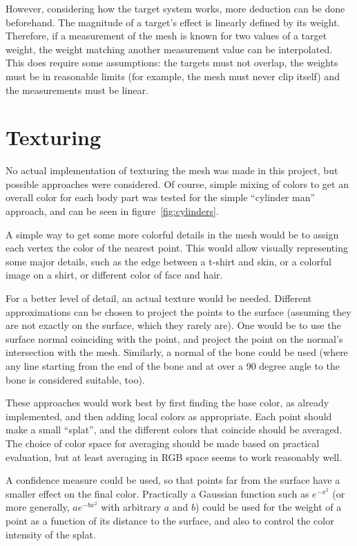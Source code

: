 However, considering how the target system works, more deduction can be done beforehand. The magnitude of a target's effect is linearly defined by its weight. Therefore, if a measurement of the mesh is known for two values of a target weight, the weight matching another measurement value can be interpolated. This does require some assumptions: the targets must not overlap, the weights must be in reasonable limits (for example, the mesh must never clip itself) and the measurements must be linear.


\section{Texturing}

No actual implementation of texturing the mesh was made in this project, but possible approaches were considered. Of course, simple mixing of colors to get an overall color for each body part was tested for the simple ``cylinder man'' approach, and can be seen in figure~\ref{fig:cylinders}.

A simple way to get some more colorful details in the mesh would be to assign each vertex the color of the nearest point. This would allow visually representing some major details, such as the edge between a t-shirt and skin, or a colorful image on a shirt, or different color of face and hair.

For a better level of detail, an actual texture would be needed. Different approximations can be chosen to project the points to the surface (assuming they are not exactly on the surface, which they rarely are). One would be to use the surface normal coinciding with the point, and project the point on the normal's intersection with the mesh. Similarly, a normal of the bone could be used (where any line starting from the end of the bone and at over a 90 degree angle to the bone is considered suitable, too).

These approaches would work best by first finding the base color, as already implemented, and then adding local colors as appropriate. Each point should make a small ``splat'', and the different colors that coincide should be averaged. The choice of color space for averaging should be made based on practical evaluation, but at least averaging in RGB space seems to work reasonably well.

A confidence measure could be used, so that points far from the surface have a smaller effect on the final color. Practically a Gaussian function such as $e^{-x^2}$ (or more generally, $a e^{-b x^2}$ with arbitrary $a$ and $b$) could be used for the weight of a point as a function of its distance to the surface, and also to control the color intensity of the splat.

